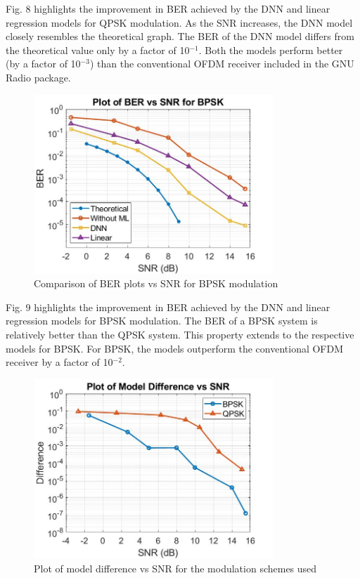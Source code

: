 \documentclass[conference]{IEEEtran}
\begin{document}
Fig. 8 highlights the improvement in BER achieved by the DNN and linear regression models for QPSK modulation. As the SNR increases, the DNN model closely resembles the theoretical graph. The BER of the DNN model differs from the theoretical value only by a factor of 10$^{-1}$. Both the models perform better (by a factor of 10$^{-3}$) than the conventional OFDM receiver included in the GNU Radio package.

\begin{figure}[htbp]
\centerline{\includegraphics[width=9cm]{ber_plot_bpskv2.jpg}}
\caption{Comparison of BER plots vs SNR for BPSK modulation}
\label{qpsk}
\end{figure}

Fig. 9 highlights the improvement in BER achieved by the DNN and linear regression models for BPSK modulation. The BER of a BPSK system is relatively better than the QPSK system. This property extends to the respective models for BPSK. For BPSK, the models outperform the conventional OFDM receiver by a factor of 10$^{-2}$.

\begin{figure}[htbp]
\centerline{\includegraphics[width=9cm]{model_differencev2.jpg}}
\caption{Plot of model difference vs SNR for the modulation schemes used}
\label{model_diff}
\end{figure}
\end{document}
